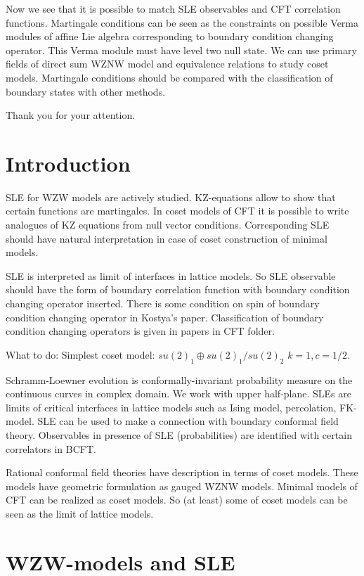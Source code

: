 \documentclass[12pt]{article}
\theoremstyle{definition}
\theoremstyle{definition} \newtheorem{Def}{Definition}
\begin{document}
Now we see that it is possible to match SLE observables and CFT correlation functions. Martingale conditions can be seen as the constraints on possible Verma modules of affine Lie algebra corresponding to boundary condition changing operator. This Verma module must have level two null state. 
We can use primary fields of direct sum WZNW model and equivalence relations to study coset models. 
Martingale conditions should be compared with the classification of boundary states with other methods.

Thank you for your attention. 

\section{Introduction}
SLE for WZW models are actively studied. KZ-equations allow to show that certain functions are martingales. 
In coset models of CFT it is possible to write analogues of KZ equations from null vector conditions. 
Corresponding SLE should have natural interpretation in case of coset construction of minimal models. 

SLE is interpreted as limit of interfaces in lattice models. So SLE observable should have the form of boundary correlation function with boundary condition changing operator inserted. There is some condition on spin of boundary condition changing operator in Kostya's paper.  Classification of boundary condition changing operators is given in papers in CFT folder. 

What to do:
Simplest coset model: $su(2)_{1}\oplus su(2)_{1}/su(2)_{2}$ $k=1, c=1/2$.

Schramm-Loewner evolution is conformally-invariant probability measure on the continuous curves in complex domain. We work with upper half-plane. SLEs are limits of critical interfaces in lattice models such as Ising model, percolation, FK-model. 
SLE can be used to make a connection with boundary conformal field theory. Observables in presence of SLE (probabilities) are identified with certain correlators in BCFT. 

Rational conformal field theories have description in terms of coset models. These models have geometric formulation as gauged WZNW models. Minimal models of CFT can be realized as coset models. So (at least) some of coset models can be seen as the limit of lattice models. 
\section{WZW-models and SLE}
\label{sec:wzw-models-sle}
\end{document}
